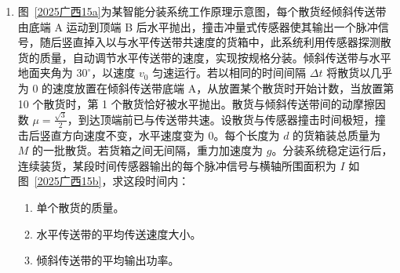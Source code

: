 \documentclass[\gkver]{gaokaozhenti}
\begin{document}
\begin{enumerate}
{根据图像可知 $v^{2}-\frac{1}{r}$ 关系为一条倾斜直线，故假设成立，将图像中 $\left(\frac{1}{2a}, 0\right)$ 代入关系式可得其动能与电势能之和为 $C = -\frac{kQq}{2a}$
}

\item
图~\ref{2025广西15a}为某智能分装系统工作原理示意图，每个散货经倾斜传送带由底端 A 运动到顶端 B 后水平抛出，撞击冲量式传感器使其输出一个脉冲信号，随后竖直掉入以与水平传送带共速度的货箱中，此系统利用传感器探测散货的质量，自动调节水平传送带的速度，实现按规格分装。倾斜传送带与水平地面夹角为 $30^\circ$，以速度 $v_{0}$ 匀速运行。若以相同的时间间隔 $\Delta t$ 将散货以几乎为 0 的速度放置在倾斜传送带底端 A，从放置某个散货时开始计数，当放置第 10 个散货时，第 1 个散货恰好被水平抛出。散货与倾斜传送带间的动摩擦因数 $\mu = \frac{\sqrt{3}}{2}$，到达顶端前已与传送带共速。设散货与传感器撞击时间极短，撞击后竖直方向速度不变，水平速度变为 0。每个长度为 $d$ 的货箱装总质量为 $M$ 的一批散货。若货箱之间无间隔，重力加速度为 $g$。分装系统稳定运行后，连续装货，某段时间传感器输出的每个脉冲信号与横轴所围面积为 $I$ 如图~\ref{2025广西15b}，求这段时间内：
\begin{enumerate}
	\item
	单个散货的质量。
	\item
	水平传送带的平均传送速度大小。
	\item
	倾斜传送带的平均输出功率。
\end{enumerate}


\end{enumerate}
\end{document}
